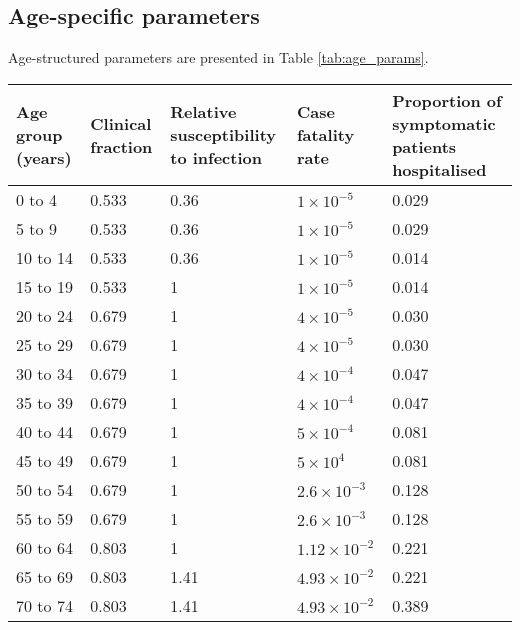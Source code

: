 \subsection{Age-specific parameters}
Age-structured parameters are presented in Table \ref{tab:age_params}.

\begin{table}
    \begin{threeparttable}
    \begin{tabularx}{\textwidth}{| X | X | X | X | X |}
        \hline
        Age group (years) & Clinical fraction\tnote{a} & 
        Relative susceptibility to infection & Case fatality rate & 
        Proportion of symptomatic patients hospitalised \\
        \hline
        0 to 4 & 0.533 & 0.36 & $1\times10^{-5}$ & 0.029 \\
        \hline
        5 to 9 & 0.533 & 0.36 & $1\times10^{-5}$ & 0.029 \\
        \hline
        10 to 14 & 0.533 & 0.36 & $1\times10^{-5}$ & 0.014 \\
        \hline
        15 to 19 & 0.533 & 1 & $1\times10^{-5}$ & 0.014 \\
        \hline
        20 to 24 & 0.679 & 1 & $4\times10^{-5}$ & 0.030 \\
        \hline
        25 to 29 & 0.679 & 1 & $4\times10^{-5}$ & 0.030 \\
        \hline
        30 to 34 & 0.679 & 1 & $4\times10^{-4}$ & 0.047 \\
        \hline
        35 to 39 & 0.679 & 1 & $4\times10^{-4}$ & 0.047 \\
        \hline
        40 to 44 & 0.679 & 1 & $5\times10^{-4}$ & 0.081 \\
        \hline
        45 to 49 & 0.679 & 1 & $5\times10^{4}$ & 0.081 \\
        \hline
        50 to 54 & 0.679 & 1 & $2.6\times10^{-3}$ & 0.128 \\
        \hline
        55 to 59 & 0.679 & 1 & $2.6\times10^{-3}$ & 0.128 \\
        \hline
        60 to 64 & 0.803 & 1 & $1.12\times10^{-2}$ & 0.221 \\
        \hline
        65 to 69 & 0.803 & 1.41 & $4.93\times10^{-2}$ & 0.221 \\
        \hline
        70 to 74 & 0.803 & 1.41 & $4.93\times10^{-2}$ & 0.389 \\

\end{tabularx}
\end{threeparttable}
\end{table}
